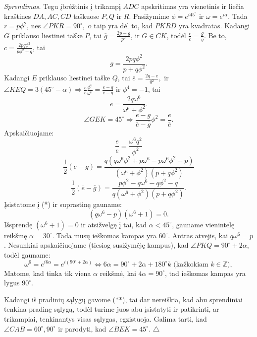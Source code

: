 \documentclass[11pt,a4paper,twoside]{book}
\newenvironment{sprendimas}{\noindent \textit{Sprendimas.}}{\hfill $\triangle$}
\theoremstyle{definition} \newtheorem*{api}{Apibrėžimas}
\theoremstyle{remark} \newtheorem*{pastaba}{Pastaba}
\begin{document}
\begin{sprendimas}
Tegu įbrėžtinis į trikampį $ADC$ apskritimas yra vienetinis ir liečia kraštines $DA, AC, CD$  taškuose $P, Q$ ir $R$. Pasižymime $\phi=e^{i45^{\circ}}$ ir $\omega=e^{i\alpha}$. Tada $r=p\phi^2$, nes $\angle PKR=90^{\circ},$ o taip yra dėl to, kad $PKRD$ yra kvadratas.
Kadangi $G$ priklauso liestinei taške $P$, tai $\overline{g}=\frac{2p-g}{p^2}$, ir $G\in CK$, todėl $\frac{c}{\overline{c}}=\frac{g}{\overline{g}}$. Be to, $c=\frac{2pq\phi^2}{p\phi^2+q}$, tai
$$g=\frac{2pq\phi ^2}{p+q\phi^2}.$$
Kadangi $E$ priklauso liestinei taške $Q$, tai $\overline{e}=\frac{2q-e}{q^2},$ ir $\angle KEQ=3(45^{\circ}-\alpha) \Rightarrow  \frac{e}{\overline{e}}\frac{\phi^6}{\omega^6}= \frac{e-q}{\overline{e}-\overline{q}}$ ir $\phi^4=-1$, tai
$$e=\frac{2q\omega^6}{\omega^6 +\phi ^2}.$$
\begin{equation*}
\angle GEK = 45^{\circ} \Rightarrow \frac{e-g}{\overline{e}-\overline{g}}\phi^2=\frac{e}{\overline{e}}.\tag{*}
\end{equation*}
Apskaičiuojame:
$$\frac{e}{\overline{e}}= \frac{\omega^6q^2}{\phi^2}$$
$$\frac{1}{2}(e-g)=\frac{q(q\omega^6\phi^2 +p\omega^6 -p\omega^6\phi^2 +p)}{(\omega^6+\phi^2)(p +q\phi^2)}$$
$$\frac{1}{2}(\overline{e}-\overline{g})=\frac{p\phi^2 -q\omega^6 -q\phi^2 - q}{q(\omega^6+\phi^2)(p +q\phi^2)}.$$
Įsistatome į (*) ir suprastinę gauname:
\begin{equation*}
(q\omega^6 -p)(\omega^6+1)=0. \tag{**}
\end{equation*}
Išsprendę $(\omega^6+1)=0$ ir atsižvelgę į tai, kad $ \alpha < 45^{\circ}$, gauname vienintelę reikšmę $\alpha = 30^{\circ}$. Tada mūsų ieškomas kampas yra $60^{\circ}$.
Antras atvejis, kai $q\omega^6 =p$. Nesunkiai apskaičiuojame (tiesiog susižymėję kampus), kad $\angle PKQ=90^{\circ} +2\alpha$, todėl gauname:
\begin{equation*}
\omega^6=e^{i6\alpha}=e^{i(90^{\circ} +2\alpha)} \Leftrightarrow 6\alpha=90^{\circ} +2\alpha +180^{\circ}k \text{ (kažkokiam } k\in \mathbb{Z}),
\end{equation*}
Matome, kad tinka tik viena $\alpha$ reikšmė, kai $4\alpha=90^{\circ}$, tad ieškomas kampas yra lygus $90^{\circ}$.

Kadangi iš pradinių sąlygų gavome (**), tai dar nereiškia, kad abu sprendiniai tenkina pradinę sąlygą, todėl turime juos abu įsistatyti ir patikrinti, ar trikampiai, tenkinantys visas sąlygas, egzistuoja. Galima tarti, kad $\angle CAB= 60^{\circ},90^{\circ}$ ir parodyti, kad $\angle BEK =45^{\circ}$.
\end{sprendimas}
\end{document}
